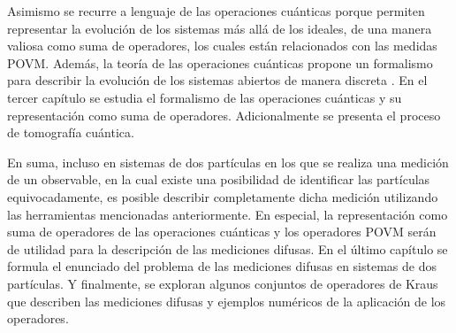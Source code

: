 Asimismo se recurre a lenguaje de las operaciones cuánticas porque permiten representar la evolución de los sistemas más allá de los ideales, de una manera valiosa como suma de operadores, los cuales están relacionados con las medidas POVM\@. Además, la teoría de las operaciones cuánticas propone un formalismo para describir la evolución de los sistemas abiertos de manera discreta {\cite{nielsen_chuang_2010}}. En el tercer capítulo se estudia el formalismo de las operaciones cuánticas y su representación como suma de operadores. Adicionalmente se presenta el proceso de tomografía cuántica.

En suma, incluso en sistemas de dos partículas en los que se realiza una medición de un observable, en la cual existe una posibilidad de identificar las partículas equivocadamente, es posible describir completamente dicha medición utilizando las herramientas mencionadas anteriormente. En especial, la representación como suma de operadores de las operaciones cuánticas y los operadores POVM serán de utilidad para la descripción de las mediciones difusas. En el último capítulo se formula el enunciado del problema de las mediciones difusas en sistemas de dos partículas. Y finalmente, se exploran algunos conjuntos de operadores de Kraus que describen las mediciones difusas y ejemplos numéricos de la aplicación de los operadores. 







